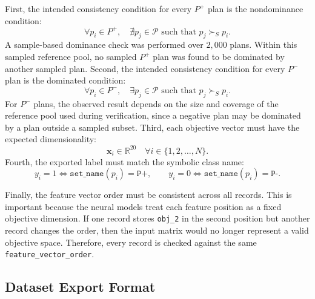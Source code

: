 First, the intended consistency condition for every $P^{+}$ plan is the nondominance condition:
\begin{equation}
    \forall p_i \in P^{+},
    \quad
    \nexists p_j \in \mathcal{P}
    \text{ such that }
    p_j \succ_S p_i.
    \label{eq:consistency_positive}
\end{equation}
%
A sample-based dominance check was performed over $2{,}000$ plans. Within this sampled reference pool, no sampled $P^{+}$ plan was found to be dominated by another sampled plan.
%
\newline
%
Second, the intended consistency condition for every $P^{-}$ plan is the dominated condition:
\begin{equation}
    \forall p_i \in P^{-},
    \quad
    \exists p_j \in \mathcal{P}
    \text{ such that }
    p_j \succ_S p_i.
    \label{eq:consistency_negative}
\end{equation}
For $P^{-}$ plans, the observed result depends on the size and coverage of the reference pool used during verification, since a negative plan may be dominated by a plan outside a sampled subset.
%
\newline
%
Third, each objective vector must have the expected dimensionality:
\begin{equation}
    \mathbf{x}_i \in \mathbb{R}^{20}
    \quad
    \forall i \in \{1,2,\ldots,N\}.
    \label{eq:feature_dimension_check}
\end{equation}
Fourth, the exported label must match the symbolic class name:
\begin{equation}
    y_i = 1 \iff \texttt{set\_name}(p_i)=\texttt{P+},
    \qquad
    y_i = 0 \iff \texttt{set\_name}(p_i)=\texttt{P-}.
    \label{eq:label_setname_consistency}
\end{equation}

Finally, the feature vector order must be consistent across all records. This is important because the neural models treat each feature position as a fixed objective dimension. If one record stores \texttt{obj\_2} in the second position but another record changes the order, then the input matrix would no longer represent a valid objective space. Therefore, every record is checked against the same \texttt{feature\_vector\_order}.

\subsection{Dataset Export Format}
\label{subsec:dataset_export_format}

